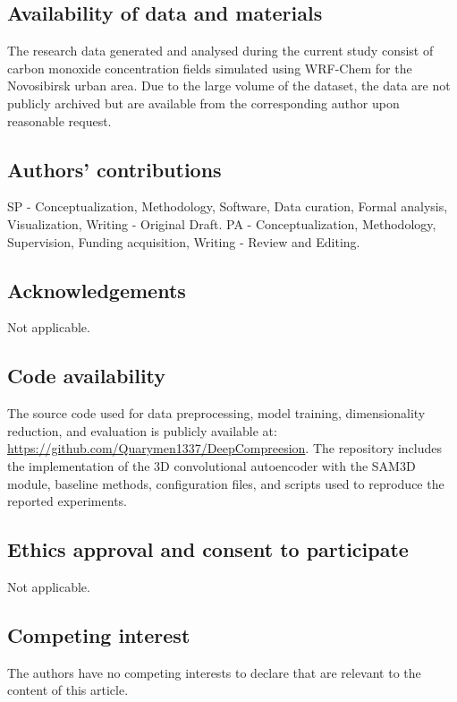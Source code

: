\documentclass[pdflatex,sn-mathphys-num]{sn-jnl}%
\theoremstyle{thmstyleone}%
\theoremstyle{thmstyletwo}%
\theoremstyle{thmstylethree}%
\begin{document}
\subsection*{Availability of data and materials}
The research data generated and analysed during the current study consist of carbon monoxide concentration fields simulated using WRF-Chem for the Novosibirsk urban area. Due to the large volume of the dataset, the data are not publicly archived but are available from the corresponding author upon reasonable request. 

\subsection*{Authors’ contributions}
SP - Conceptualization, Methodology, Software, Data curation, Formal analysis, Visualization, Writing - Original Draft. PA - Conceptualization, Methodology, Supervision, Funding acquisition, Writing - Review and Editing.

\subsection*{Acknowledgements}
Not applicable.


\subsection*{Code availability}
The source code used for data preprocessing, model training, dimensionality reduction, and evaluation is publicly available at: \url{https://github.com/Quarymen1337/DeepCompreesion}. The repository includes the implementation of the 3D convolutional autoencoder with the SAM3D module, baseline methods, configuration files, and scripts used to reproduce the reported experiments.

\subsection*{Ethics approval and consent to participate}
Not applicable.

\subsection*{Competing interest}
The authors have no competing interests to declare that are relevant to the content of this article.




\bigskip


\end{document}
